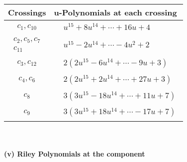 \documentclass[1p]{elsarticle_modified}
\theoremstyle{definition}
\begin{document}
\begin{tabular}{m{50pt}|m{274pt}}
Crossings & \hspace{64pt}u-Polynomials at each crossing \\
\hline $$\begin{aligned}c_{1},c_{10}\end{aligned}$$&$\begin{aligned}
&u^{15}+8 u^{14}+\cdots+16 u+4
\end{aligned}$\\
\hline $$\begin{aligned}c_{2},c_{5},c_{7}\\c_{11}\end{aligned}$$&$\begin{aligned}
&u^{15}-2 u^{14}+\cdots-4 u^2+2
\end{aligned}$\\
\hline $$\begin{aligned}c_{3},c_{12}\end{aligned}$$&$\begin{aligned}
&2(2 u^{15}-6 u^{14}+\cdots-9 u+3)
\end{aligned}$\\
\hline $$\begin{aligned}c_{4},c_{6}\end{aligned}$$&$\begin{aligned}
&2(2 u^{15}+2 u^{14}+\cdots+27 u+3)
\end{aligned}$\\
\hline $$\begin{aligned}c_{8}\end{aligned}$$&$\begin{aligned}
&3(3 u^{15}-18 u^{14}+\cdots+11 u+7)
\end{aligned}$\\
\hline $$\begin{aligned}c_{9}\end{aligned}$$&$\begin{aligned}
&3(3 u^{15}+18 u^{14}+\cdots-17 u+7)
\end{aligned}$\\
\hline
\end{tabular}\\~\\
\newpage\renewcommand{\arraystretch}{1}
\flushleft \textbf{(v) Riley Polynomials at the component}\newline \\
\end{document}
